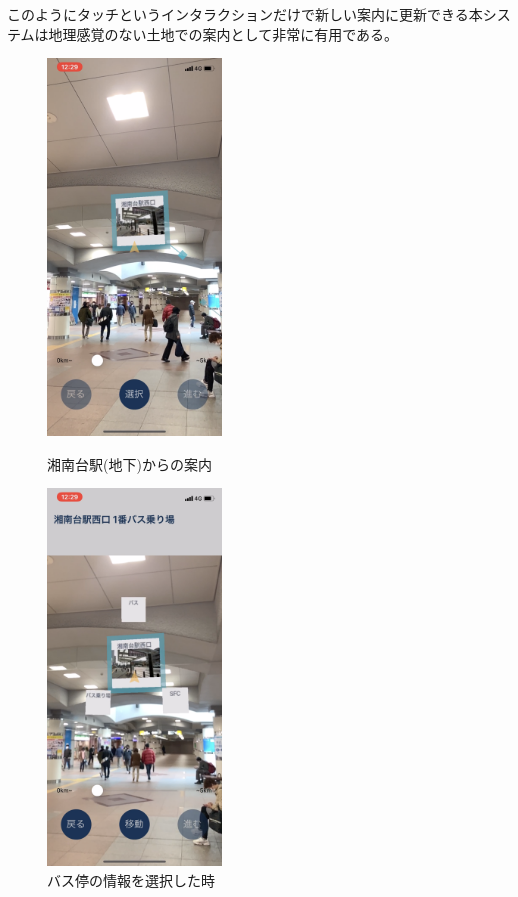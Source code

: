 このようにタッチというインタラクションだけで新しい案内に更新できる本システムは地理感覚のない土地での案内として非常に有用である。


\begin{figure}[H]
  \begin{minipage}{0.5\hsize}
    \centering
    \includegraphics[height=100mm]{images/shonandai_bus_exit1.png}
    \caption{湘南台駅(地下)からの案内} \label{fig:shonandai_bus_exit1}
  \end{minipage}
  \begin{minipage}{0.5\hsize}
    \centering
    \includegraphics[height=100mm]{images/shonandai_bus_exit_selected.png}
    \caption{バス停の情報を選択した時} \label{fig:shonandai_bus_exit_selected}
  \end{minipage}
\end{figure}

